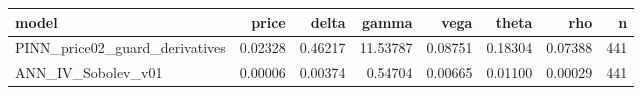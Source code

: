 \begin{tabular}{lrrrrrrr}
\toprule
model & price & delta & gamma & vega & theta & rho & n \\
\midrule
PINN_price02_guard_derivatives & 0.02328 & 0.46217 & 11.53787 & 0.08751 & 0.18304 & 0.07388 & 441 \\
ANN_IV_Sobolev_v01 & 0.00006 & 0.00374 & 0.54704 & 0.00665 & 0.01100 & 0.00029 & 441 \\
\bottomrule
\end{tabular}
